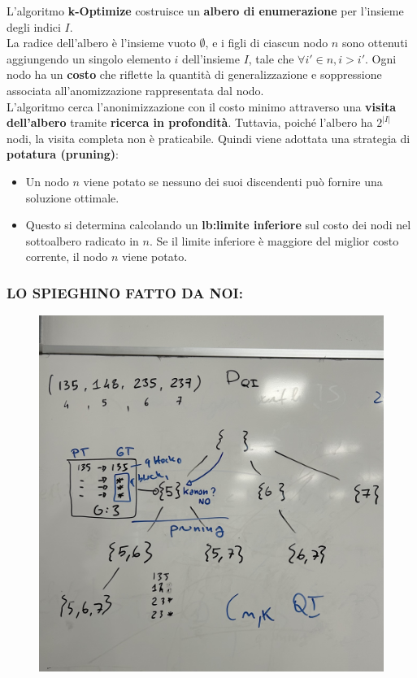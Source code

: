 \documentclass{report}
\begin{document}
\noindent L'algoritmo \textbf{k-Optimize} costruisce un \textbf{albero di enumerazione} per l'insieme degli indici $I$. \\
La radice dell'albero è l'insieme vuoto $\emptyset$, e i figli di ciascun nodo $n$ sono ottenuti aggiungendo un singolo elemento $i$ dell'insieme $I$, tale che $\forall i' \in n, i > i'$. 
Ogni nodo ha un \textbf{costo} che riflette la quantità di generalizzazione e soppressione associata all'anomizzazione rappresentata dal nodo. \\
L'algoritmo cerca l'anonimizzazione con il costo minimo attraverso una \textbf{visita dell'albero} tramite \textbf{ricerca in profondità}. 
Tuttavia, poiché l'albero ha $2^{|I|}$ nodi, la visita completa non è praticabile. Quindi viene adottata una strategia di \textbf{potatura (pruning)}:

\begin{itemize}
    \item Un nodo $n$ viene potato se nessuno dei suoi discendenti può fornire una soluzione ottimale.
    \item Questo si determina calcolando un \textbf{lb:limite inferiore} sul costo dei nodi nel sottoalbero radicato in $n$. 
    Se il limite inferiore è maggiore del miglior costo corrente, il nodo $n$ viene potato.
\end{itemize}

\newpage
\noindent \subsubsection{LO SPIEGHINO FATTO DA NOI:}
\begin{figure}[ht]
    \centering
    \includegraphics[width=1\linewidth]{images/foto k-optimize.jpg}
\end{figure}
\end{document}

